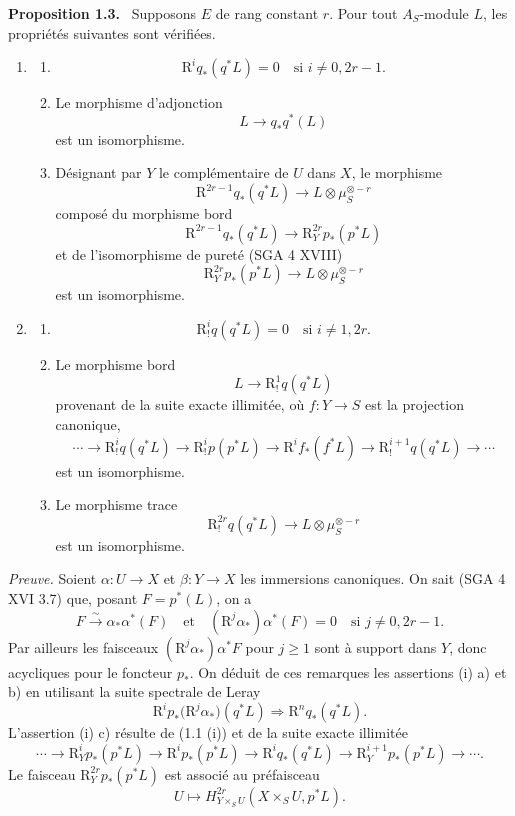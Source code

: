 \documentclass[11pt]{article}
\newenvironment{statement}[1]{\par\medskip\noindent\textbf{#1.}\ }{\par\medskip}
\newcommand{\R}{\mathrm{R}}\newcommand{\RHomCore}{\mathrm{RHom}}
\providecommand{\R}{\mathrm R}
\begin{document}
\begin{statement}{Proposition 1.3}
Supposons $E$ de rang constant $r$. Pour tout $A_S$-module $L$, les propriétés suivantes sont vérifiées.
\begin{enumerate}[label=(\roman*)]
\item
\begin{enumerate}[label=\alph*)]
\item
\[
\R^i q_*(q^*L)=0\quad\text{si }i\ne 0,2r-1.
\]
\item Le morphisme d'adjonction
\[
L\longrightarrow q_*q^*(L)
\]
est un isomorphisme.
\item Désignant par $Y$ le complémentaire de $U$ dans $X$, le morphisme
\[
\R^{2r-1}q_*(q^*L)\longrightarrow L\otimes\mu_S^{\otimes -r}
\]
composé du morphisme bord
\[
\R^{2r-1}q_*(q^*L)\longrightarrow \R_Y^{2r}p_*(p^*L)
\tag{1}
\]
et de l'isomorphisme de pureté (SGA 4 XVIII)
\[
\R_Y^{2r}p_*(p^*L)\longrightarrow L\otimes\mu_S^{\otimes -r}
\]
est un isomorphisme.
\end{enumerate}
\item
\begin{enumerate}[label=\alph*)]
\item
\[
\R_!^i q(q^*L)=0\quad\text{si }i\ne 1,2r.
\]
\item Le morphisme bord
\[
L\longrightarrow \R_!^1 q(q^*L)
\]
provenant de la suite exacte illimitée, où $f:Y\to S$ est la projection canonique,
\[
\cdots\longrightarrow \R_!^i q(q^*L)\longrightarrow \R_!^i p(p^*L)
\longrightarrow \R^i f_*(f^*L)\longrightarrow \R_!^{i+1}q(q^*L)\longrightarrow\cdots
\]
est un isomorphisme.
\item Le morphisme trace
\[
\R_!^{2r}q(q^*L)\longrightarrow L\otimes\mu_S^{\otimes -r}
\]
est un isomorphisme.
\end{enumerate}
\end{enumerate}
\end{statement}

\emph{Preuve.} Soient $\alpha:U\to X$ et $\beta:Y\to X$ les immersions canoniques. On sait (SGA 4 XVI 3.7) que, posant $F=p^*(L)$, on a
\[
F\xrightarrow{\sim}\alpha_*\alpha^*(F)
\quad\text{et}\quad
(\R^j\alpha_*)\alpha^*(F)=0\quad\text{si }j\ne0,2r-1.
\]
Par ailleurs les faisceaux $(\R^j\alpha_*)\alpha^*F$ pour $j\ge1$ sont à support dans $Y$, donc acycliques pour le foncteur $p_*$. On déduit de ces remarques les assertions (i) a) et b) en utilisant la suite spectrale de Leray
\[
\R^i p_*\bigl(\R^j\alpha_*\bigr)(q^*L)\Longrightarrow \R^n q_*(q^*L).
\]
L'assertion (i) c) résulte de (1.1 (i)) et de la suite exacte illimitée
\[
\cdots\longrightarrow \R_Y^i p_*(p^*L)\longrightarrow \R^i p_*(p^*L)\longrightarrow \R^i q_*(q^*L)
\longrightarrow \R_Y^{i+1}p_*(p^*L)\longrightarrow\cdots.
\]
Le faisceau $\R_Y^{2r}p_*(p^*L)$ est associé au préfaisceau
\[
U\longmapsto H^{2r}_{Y\times_S U}(X\times_S U,p^*L).
\]
\end{document}
